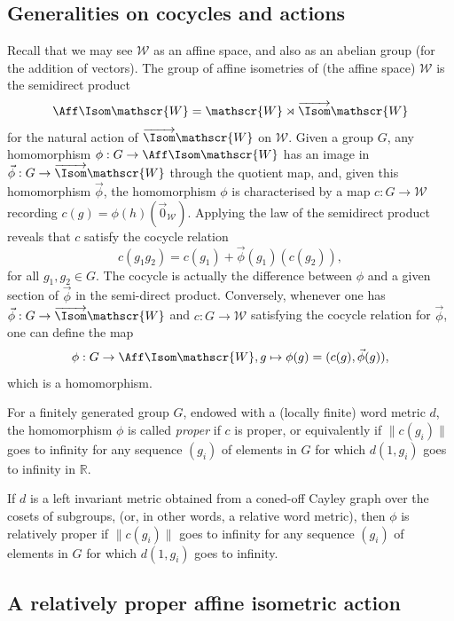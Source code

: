 \subsection{Generalities on cocycles and actions} Recall that we may see $ {\mathscr{W}} $ as an affine space, and also as an abelian group (for the addition of vectors). The group of affine isometries of (the affine space) ${\mathscr{W}} $ is the semidirect
product
\[
{\Aff \Isom} {\mathscr{W}} = {\mathscr{W}} \rtimes \overrightarrow{{\Isom}} {\mathscr{W}}
\]
for
the natural action of $\overrightarrow{{\Isom}} {\mathscr{W}} $ on ${\mathscr{W}} $. Given a group $G$, any homomorphism $\phi:G\to {\Aff \Isom}{\mathscr{W}}$ has an image in $\vec{\phi}:G\to \overrightarrow{{\Isom}} {\mathscr{W}} $ through the quotient map, and, given this homomorphism $\vec{\phi}$, the homomorphism $\phi$ is characterised by a map $c:G\to {\mathscr{W}} $ recording $c(g) =
\phi(h)(\vec{0}_ {\mathscr{W}})$. Applying the law of the semidirect product reveals that $c$ satisfy the cocycle relation
\[
c(g_1g_2) = c(g_1) + \vec{\phi}(g_1) (c(g_2)),
\]
for all $g_1,g_2\in G$. The cocycle is actually the difference between $\phi$ and a given section of $\vec{\phi}$ in the semi-direct product. Conversely, whenever one has $\vec{\phi}:G\to \overrightarrow{{\Isom}} {\mathscr{W}}$ and $c:G\to {\mathscr{W}}$ satisfying the cocycle relation for $\vec{\phi}$, one can define the map
\[
\phi:G\to {\Aff \Isom} {\mathscr{W}}, g\mapsto \phi(g) = (c(g), \vec{\phi}(g)),
\]
which is a homomorphism.


\begin{defi}\label{proper}
For a finitely generated group $G$, endowed
with a (locally finite) word metric $d$, the homomorphism $\phi$ is called \emph{proper} if $c$ is proper, or equivalently if $\|c(g_i)\|$ goes to infinity for any sequence $(g_i)$ of elements in $G$ for which $d(1,g_i)$ goes to infinity in $\mathbb{R}$.

If $d$ is a left invariant metric obtained from a coned-off Cayley graph over the cosets of subgroups, (or, in other words, a relative word metric), then $\phi$ is relatively proper if $\|c(g_i)\|$ goes to infinity for any sequence $(g_i)$ of elements in $G$ for which $d(1,g_i)$ goes to infinity.
\end{defi}

\subsection{A relatively proper affine isometric action}

